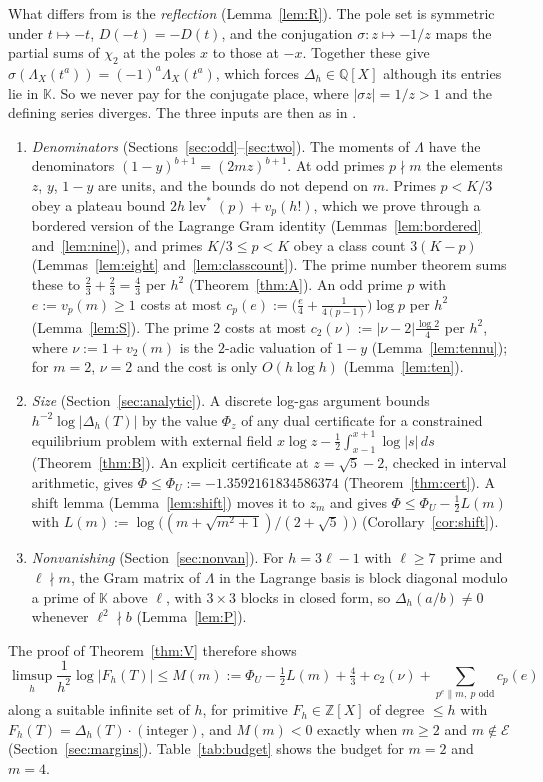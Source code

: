 \documentclass[11pt]{amsart}
\theoremstyle{definition}
\theoremstyle{remark}
\numberwithin{equation}{section}
\newcommand{\ZZ}{\mathbb{Z}}
\newcommand{\QQ}{\mathbb{Q}}
\newcommand{\KK}{\mathbb{K}}
\newcommand{\cE}{\mathcal{E}}
\newcommand{\lev}{\operatorname{lev}^{*}}
\begin{document}
What differs from \cite{Chi2Paper} is the \emph{reflection} (Lemma~\ref{lem:R}). The pole set is symmetric under
$t\mapsto-t$, $D(-t)=-D(t)$, and the conjugation $\sigma\colon z\mapsto-1/z$ maps the partial sums of $\chi_2$ at the poles
$x$ to those at $-x$. Together these give $\sigma(\Lambda_X(t^a))=(-1)^a\Lambda_X(t^a)$, which forces $\Delta_h\in\QQ[X]$
although its entries lie in $\KK$. So we never pay for the conjugate place, where $|\sigma z|=1/z>1$ and the defining
series diverges. The three inputs are then as in \cite{Chi2Paper}.
\begin{enumerate}
\item \emph{Denominators} (Sections~\ref{sec:odd}--\ref{sec:two}). The moments of $\Lambda$ have the denominators
  $(1-y)^{b+1}=(2mz)^{b+1}$. At odd primes $p\nmid m$ the elements $z$, $y$, $1-y$ are units, and the bounds do not
  depend on $m$. Primes $p<K/3$ obey a plateau bound $2h\lev(p)+v_p(h!)$, which we prove through a bordered version of the
  Lagrange Gram identity (Lemmas~\ref{lem:bordered} and~\ref{lem:nine}), and primes $K/3\le p<K$ obey a class count
  $3(K-p)$ (Lemmas~\ref{lem:eight} and~\ref{lem:classcount}). The prime number theorem sums these to
  $\frac23+\frac23=\frac43$ per $h^2$ (Theorem~\ref{thm:A}). An odd prime $p$ with $e:=v_p(m)\ge1$ costs at most
  $c_p(e):=\bigl(\frac e4+\frac1{4(p-1)}\bigr)\log p$ per $h^2$ (Lemma~\ref{lem:S}). The prime $2$ costs at most
  $c_2(\nu):=|\nu-2|\frac{\log2}4$ per $h^2$, where $\nu:=1+v_2(m)$ is the $2$-adic valuation of $1-y$
  (Lemma~\ref{lem:tennu}); for $m=2$, $\nu=2$ and the cost is only $O(h\log h)$ (Lemma~\ref{lem:ten}).
\item \emph{Size} (Section~\ref{sec:analytic}). A discrete log-gas argument bounds $h^{-2}\log|\Delta_h(T)|$ by the value
  $\Phi_z$ of any dual certificate for a constrained equilibrium problem with external field
  $x\log z-\frac12\int_{x-1}^{x+1}\log|s|\,ds$ (Theorem~\ref{thm:B}). An explicit certificate at $z=\sqrt5-2$, checked
  in interval arithmetic, gives $\Phi\le\Phi_U:=-1.3592161834586374$ (Theorem~\ref{thm:cert}). A shift lemma
  (Lemma~\ref{lem:shift}) moves it to $z_m$ and gives $\Phi\le\Phi_U-\frac12L(m)$ with
  $L(m):=\log\bigl((m+\sqrt{m^2+1})/(2+\sqrt5)\bigr)$ (Corollary~\ref{cor:shift}).
\item \emph{Nonvanishing} (Section~\ref{sec:nonvan}). For $h=3\ell-1$ with $\ell\ge7$ prime and $\ell\nmid m$, the Gram
  matrix of $\Lambda$ in the Lagrange basis is block diagonal modulo a prime of $\KK$ above $\ell$, with $3\times3$ blocks
  in closed form, so $\Delta_h(a/b)\ne0$ whenever $\ell^2\nmid b$ (Lemma~\ref{lem:P}).
\end{enumerate}
The proof of Theorem~\ref{thm:V} therefore shows
\begin{equation}\label{eq:budget}
  \limsup_{h}\frac1{h^2}\log|F_h(T)|\le M(m):=\Phi_U-\tfrac12L(m)+\tfrac43+c_2(\nu)+\sum_{p^e\parallel m,\ p\text{ odd}}c_p(e)
\end{equation}
along a suitable infinite set of $h$, for primitive $F_h\in\ZZ[X]$ of degree $\le h$ with $F_h(T)=\Delta_h(T)\cdot
(\text{integer})$, and $M(m)<0$ exactly when $m\ge2$ and $m\notin\cE$ (Section~\ref{sec:margins}).
Table~\ref{tab:budget} shows the budget for $m=2$ and $m=4$.
\end{document}
